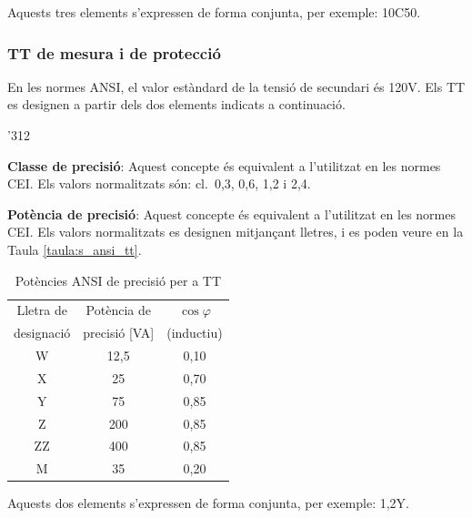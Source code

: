 Aquests tres elements s'expressen de forma conjunta, per exemple:
10C50.

\subsubsection{TT de mesura i de protecci\'{o}}

En les normes \textsf{ANSI}, el valor est\`{a}ndard de la tensi\'{o} de
secundari \'{e}s 120\unit{V}. Els TT es designen a partir dels dos
elements indicats a continuaci\'{o}.

\begin{dingautolist}{'312}
    \item \textbf{Classe de precisi\'{o}}: Aquest concepte \'{e}s equivalent
    a l'utilitzat en les normes \textsf{CEI}. Els valors
    normalitzats s\'{o}n: cl.~0,3, 0,6, 1,2 i 2,4.
    \item \textbf{Pot\`{e}ncia de precisi\'{o}}: Aquest concepte \'{e}s equivalent
    a l'utilitzat en les normes \textsf{CEI}. Els valors
    normalitzats es designen mitjan\c{c}ant lletres, i es poden veure en
    la Taula \vref{taula:s_ansi_tt}.

    \begin{table}[h]
    \caption{\label{taula:s_ansi_tt} Pot\`{e}ncies \textsf{ANSI} de precisi\'{o}  per a TT}
    \begin{center}\begin{tabular}{ccc}
    \toprule[1pt]
    Lletra de & Pot\`{e}ncia de & $\cos\varphi$\\
    designaci\'{o} &  precisi\'{o} [VA] &  (inductiu)\\
    \midrule
        W & 12,5 & 0,10\\
        X & 25 & 0,70 \\
        Y & 75 & 0,85 \\
        Z & 200 & 0,85 \\
        ZZ & 400 & 0,85 \\
        M & 35 & 0,20 \\
    \bottomrule[1pt]
    \end{tabular} \end{center}
    \end{table}
\end{dingautolist}

Aquests dos elements s'expressen de forma conjunta, per exemple:
1,2Y.\pagebreak


